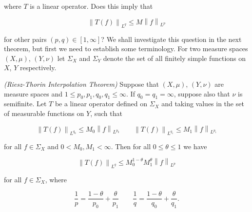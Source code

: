 where $T$ is a linear operator. Does this imply that

\begin{equation*}
	\left\| T(f)\right\|_{L^q} \leqslant M \left\| f\right\|_{L^p}
\end{equation*}

for other pairs $\left( p,q \right) \in [1,\infty]$? We shall investigate this question in the next theorem, but first we need to establish some terminology. For two measure spaces $\left( X,\mu \right)$, $\left( Y,\nu \right)$ let $\Sigma_X$ and $\Sigma_Y$ denote the set of all finitely simple functions on $X$, $Y$ respectively. 

\vspace{2mm}

\begin{mdframed}
	\begin{theorem}\emph{(Riesz-Thorin Interpolation Theorem)}
		Suppose that $(X,\mu)$, $(Y,\nu)$ are measure spaces and $1 \leqslant p_0,p_1,q_0,q_1 \leqslant \infty$. If $q_0 = q_1 = \infty$, suppose also that $\nu$ is semifinite. Let $T$ be a linear operator defined on $\Sigma_X$ and taking values in the set of measurable functions on $Y$, such that

		\begin{equation}
			\left\|T(f)\right\|_{L^{q_0}} \leqslant M_0\left\|f\right\|_{L^{p_0}} \qquad \left\|T(f)\right\|_{L^{q_1}} \leqslant M_1\left\|f\right\|_{L^{p_1}}
			\label{hyp:Lq0Lq1}
		\end{equation}

		for all $f \in \Sigma_X$ and $0 < M_0,M_1 < \infty$. Then for all $0 \leqslant \theta \leqslant 1$ we have

		\begin{equation}
			\left\|T(f)\right\|_{L^q} \leqslant M_0^{1 - \theta}M_1^\theta\left\|f\right\|_{L^p}
			\label{est:boundTf}
		\end{equation}

		for all $f \in \Sigma_X$, where

		\begin{equation*}
			\frac{1}{p} = \frac{1 - \theta}{p_0} + \frac{\theta}{p_1} \qquad \frac{1}{q} = \frac{1 - \theta}{q_0} + \frac{\theta}{q_1}.
		\end{equation*}
		\label{thm:Riesz_Thorin}
	\end{theorem}
\end{mdframed}

\vspace{2mm}


